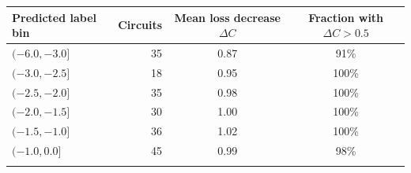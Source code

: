 \begin{tabular}{lrcc}
\toprule
Predicted label bin & Circuits & Mean loss decrease $\Delta C$ & Fraction with $\Delta C>0.5$ \\
\midrule
$(-6.0, -3.0]$ & 35 & 0.87 & 91\% \\
$(-3.0, -2.5]$ & 18 & 0.95 & 100\% \\
$(-2.5, -2.0]$ & 35 & 0.98 & 100\% \\
$(-2.0, -1.5]$ & 30 & 1.00 & 100\% \\
$(-1.5, -1.0]$ & 36 & 1.02 & 100\% \\
$(-1.0, 0.0]$ & 45 & 0.99 & 98\% \\
\botrule
\end{tabular}
